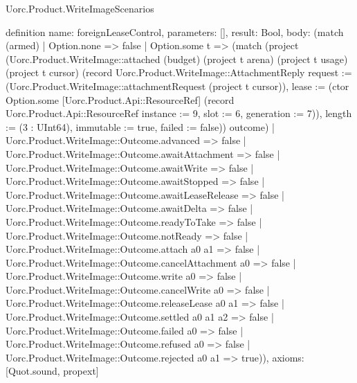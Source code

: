 \begin{lexlean}{Uorc.Product.WriteImageScenarios}
\begin{semanticmodule}
definition{
  name: foreignLeaseControl,
  parameters: [],
  result: Bool,
  body: (match (armed)
    | Option.none => false
    | Option.some t => (match (project (Uorc.Product.WriteImage::attached (budget) (project t arena) (project t usage) (project t cursor) (record Uorc.Product.WriteImage::AttachmentReply {request := (Uorc.Product.WriteImage::attachmentRequest (project t cursor)), lease := (ctor Option.some [Uorc.Product.Api::ResourceRef] (record Uorc.Product.Api::ResourceRef {instance := 9, slot := 6, generation := 7})), length := (3 : UInt64), immutable := true, failed := false})) outcome)
      | Uorc.Product.WriteImage::Outcome.advanced => false
      | Uorc.Product.WriteImage::Outcome.awaitAttachment => false
      | Uorc.Product.WriteImage::Outcome.awaitWrite => false
      | Uorc.Product.WriteImage::Outcome.awaitStopped => false
      | Uorc.Product.WriteImage::Outcome.awaitLeaseRelease => false
      | Uorc.Product.WriteImage::Outcome.awaitDelta => false
      | Uorc.Product.WriteImage::Outcome.readyToTake => false
      | Uorc.Product.WriteImage::Outcome.notReady => false
      | Uorc.Product.WriteImage::Outcome.attach a0 a1 => false
      | Uorc.Product.WriteImage::Outcome.cancelAttachment a0 => false
      | Uorc.Product.WriteImage::Outcome.write a0 => false
      | Uorc.Product.WriteImage::Outcome.cancelWrite a0 => false
      | Uorc.Product.WriteImage::Outcome.releaseLease a0 a1 => false
      | Uorc.Product.WriteImage::Outcome.settled a0 a1 a2 => false
      | Uorc.Product.WriteImage::Outcome.failed a0 => false
      | Uorc.Product.WriteImage::Outcome.refused a0 => false
      | Uorc.Product.WriteImage::Outcome.rejected a0 a1 => true)),
  axioms: [Quot.sound, propext]
}


\end{semanticmodule}
\end{lexlean}
